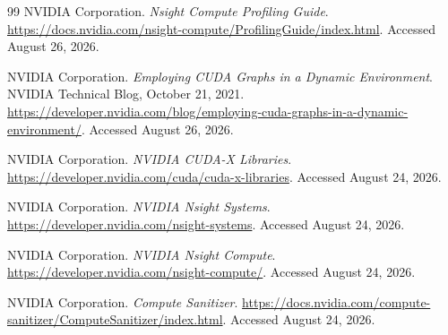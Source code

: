 \documentclass[11pt]{article}
\numberwithin{equation}{section}
\numberwithin{figure}{section}
\numberwithin{table}{section}
\begin{document}
\begin{thebibliography}{99}
NVIDIA Corporation.
\newblock \emph{Nsight Compute Profiling Guide}.
\newblock \url{https://docs.nvidia.com/nsight-compute/ProfilingGuide/index.html}.
\newblock Accessed August 26, 2026.

NVIDIA Corporation.
\newblock \emph{Employing CUDA Graphs in a Dynamic Environment}.
\newblock NVIDIA Technical Blog, October 21, 2021.
\newblock \url{https://developer.nvidia.com/blog/employing-cuda-graphs-in-a-dynamic-environment/}.
\newblock Accessed August 26, 2026.

NVIDIA Corporation.
\newblock \emph{NVIDIA CUDA-X Libraries}.
\newblock \url{https://developer.nvidia.com/cuda/cuda-x-libraries}.
\newblock Accessed August 24, 2026.

NVIDIA Corporation.
\newblock \emph{NVIDIA Nsight Systems}.
\newblock \url{https://developer.nvidia.com/nsight-systems}.
\newblock Accessed August 24, 2026.

NVIDIA Corporation.
\newblock \emph{NVIDIA Nsight Compute}.
\newblock \url{https://developer.nvidia.com/nsight-compute/}.
\newblock Accessed August 24, 2026.

NVIDIA Corporation.
\newblock \emph{Compute Sanitizer}.
\newblock \url{https://docs.nvidia.com/compute-sanitizer/ComputeSanitizer/index.html}.
\newblock Accessed August 24, 2026.

\end{thebibliography}
\endgroup
\end{document}
